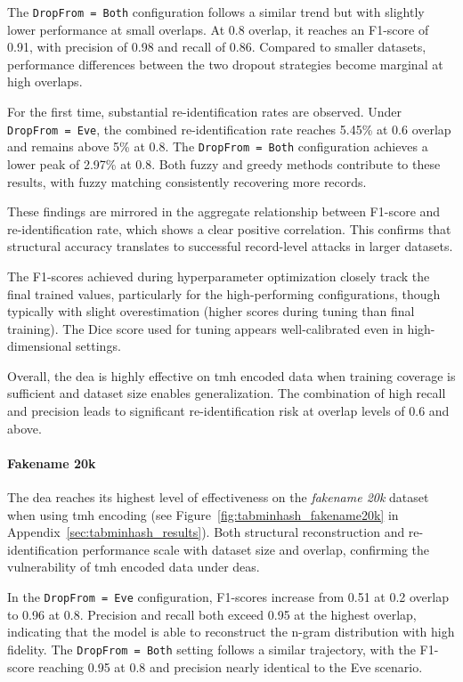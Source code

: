 The \texttt{DropFrom = Both} configuration follows a similar trend but with slightly lower performance at small overlaps.
At 0.8 overlap, it reaches an F1-score of 0.91, with precision of 0.98 and recall of 0.86.
Compared to smaller datasets, performance differences between the two dropout strategies become marginal at high overlaps.

For the first time, substantial re-identification rates are observed.
Under \texttt{DropFrom = Eve}, the combined re-identification rate reaches 5.45\% at 0.6 overlap and remains above 5\% at 0.8.
The \texttt{DropFrom = Both} configuration achieves a lower peak of 2.97\% at 0.8.
Both fuzzy and greedy methods contribute to these results, with fuzzy matching consistently recovering more records.

These findings are mirrored in the aggregate relationship between F1-score and re-identification rate, which shows a clear positive correlation. This confirms that structural accuracy translates to successful record-level attacks in larger datasets.

The F1-scores achieved during hyperparameter optimization closely track the final trained values, particularly for the high-performing configurations, though typically with slight overestimation (higher scores during tuning than final training).
The Dice score used for tuning appears well-calibrated even in high-dimensional settings.

Overall, the \ac{dea} is highly effective on \ac{tmh} encoded data when training coverage is sufficient and dataset size enables generalization.
The combination of high recall and precision leads to significant re-identification risk at overlap levels of 0.6 and above.


\paragraph{Fakename 20k}

The \ac{dea} reaches its highest level of effectiveness on the \textit{fakename 20k} dataset when using \ac{tmh} encoding (see Figure~\ref{fig:tabminhash_fakename20k} in Appendix~\ref{sec:tabminhash_results}).
Both structural reconstruction and re-identification performance scale with dataset size and overlap, confirming the vulnerability of \ac{tmh} encoded data under \ac{dea}s.

In the \texttt{DropFrom = Eve} configuration, F1-scores increase from 0.51 at 0.2 overlap to 0.96 at 0.8.
Precision and recall both exceed 0.95 at the highest overlap, indicating that the model is able to reconstruct the n-gram distribution with high fidelity.
The \texttt{DropFrom = Both} setting follows a similar trajectory, with the F1-score reaching 0.95 at 0.8 and precision nearly identical to the Eve scenario.

